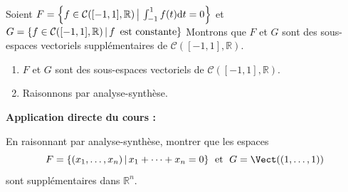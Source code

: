 \documentclass[french,11pt,twoside]{VcCours}
\newenvironment{ApplicationDirecte}{\textbf{Application directe du cours :}

}{}
\newcommand{\dx}{\text{d}x}
\newcommand{\dt}{\text{d}t}
\newcommand{\Int}[2]{\int_{#1}^{#2}}
\begin{document}
\begin{Exemple} Soient $F = \left\lbrace f \in \mathcal{C}([-1,1], \mathbb{R}) \, \big{\vert} \, \int_{ - 1}^{1} f(t) \dt = 0\right\rbrace$ et $G = \left\lbrace  f \in \mathcal{C}([-1,1], \mathbb{R})\, \vert \, f \, \hbox{ est constante} \right\rbrace$
Montrons que $F$ et $G$ sont des sous-espaces vectoriels supplémentaires de $\mathcal{C}([-1,1], \mathbb{R})$.
\begin{enumerate}
\item $F$ et $G$ sont des sous-espaces vectoriels de $\mathcal{C}([-1,1], \mathbb{R})$.
\item Raisonnons par analyse-synthèse.
%
%
%
%
%
\end{enumerate}
\vspace{17cm}
\end{Exemple}
%

\begin{ApplicationDirecte}\label{Exo}  En raisonnant par analyse-synthèse, montrer que les espaces 
$$ F = \lbrace (x_1, \ldots, x_n) \, \vert \, x_1 + \cdots + x_n = 0 \rbrace \; \hbox{ et } \; G= \Vect((1, \ldots, 1)) $$
sont supplémentaires dans $\mathbb{R}^n$.
\end{ApplicationDirecte}
\end{document}
